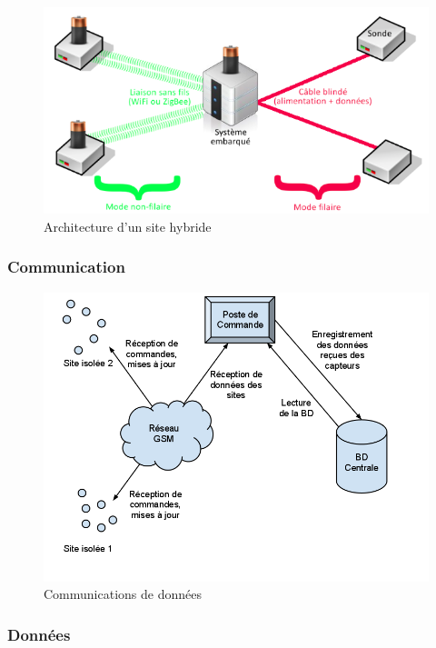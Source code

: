 \documentclass{mise_en_page}
\begin{document}
\begin{figure}[H]
	\centering
	\includegraphics[width=150mm]{hybride.png}
	\caption{Architecture d'un site hybride}
\end{figure}

\subsubsection{Communication}

\begin{figure}[H]
	\centering
	\includegraphics[width=150mm]{donnees.png}
	\caption{Communications de données}
\end{figure}

\subsubsection{Données}
\end{document}
